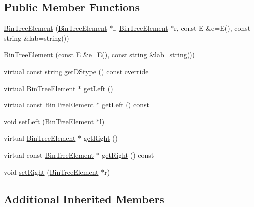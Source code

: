 \subsection*{Public Member Functions}
\begin{DoxyCompactItemize}
\item 
\mbox{\hyperlink{classbridges_1_1_bin_tree_element_a1c60db90bda9ecd3f5a61b5f33f49173}{Bin\+Tree\+Element}} (\mbox{\hyperlink{classbridges_1_1_bin_tree_element}{Bin\+Tree\+Element}} $\ast$l, \mbox{\hyperlink{classbridges_1_1_bin_tree_element}{Bin\+Tree\+Element}} $\ast$r, const E \&e=E(), const string \&lab=string())
\item 
\mbox{\hyperlink{classbridges_1_1_bin_tree_element_a37d12669e5bfe13ebf230dd8fd2a5816}{Bin\+Tree\+Element}} (const E \&e=E(), const string \&lab=string())
\item 
virtual const string \mbox{\hyperlink{classbridges_1_1_bin_tree_element_a0a154f68ef0a58715e598a6ef92b9e59}{get\+D\+Stype}} () const override
\item 
virtual \mbox{\hyperlink{classbridges_1_1_bin_tree_element}{Bin\+Tree\+Element}} $\ast$ \mbox{\hyperlink{classbridges_1_1_bin_tree_element_a8367ce9c4eea814637edc2c56efbde25}{get\+Left}} ()
\item 
virtual const \mbox{\hyperlink{classbridges_1_1_bin_tree_element}{Bin\+Tree\+Element}} $\ast$ \mbox{\hyperlink{classbridges_1_1_bin_tree_element_a0841701bd7d4b444dafbbdfefed067a5}{get\+Left}} () const
\item 
void \mbox{\hyperlink{classbridges_1_1_bin_tree_element_a8f90f7f4c8da058ebfca64dd3728c50f}{set\+Left}} (\mbox{\hyperlink{classbridges_1_1_bin_tree_element}{Bin\+Tree\+Element}} $\ast$l)
\item 
virtual \mbox{\hyperlink{classbridges_1_1_bin_tree_element}{Bin\+Tree\+Element}} $\ast$ \mbox{\hyperlink{classbridges_1_1_bin_tree_element_a5751f2fe38e2364f68dc37939fce060f}{get\+Right}} ()
\item 
virtual const \mbox{\hyperlink{classbridges_1_1_bin_tree_element}{Bin\+Tree\+Element}} $\ast$ \mbox{\hyperlink{classbridges_1_1_bin_tree_element_aa01980f4be18f6c205580ea0376a0d07}{get\+Right}} () const
\item 
void \mbox{\hyperlink{classbridges_1_1_bin_tree_element_a0131f6ecefc7f68c6502d97292ea43bf}{set\+Right}} (\mbox{\hyperlink{classbridges_1_1_bin_tree_element}{Bin\+Tree\+Element}} $\ast$r)
\end{DoxyCompactItemize}
\subsection*{Additional Inherited Members}



